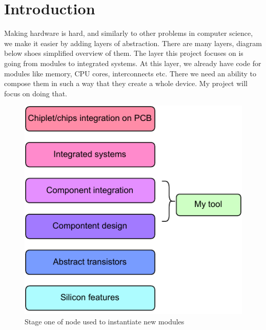 \documentclass[12pt]{report}
\begin{document}
\chapter{Introduction}
Making hardware is hard, and similarly to other problems in computer science, we make it easier by adding layers of abstraction. There are many layers, diagram below shoes simplified overview of them. The layer this project focuses on is going from modules to integrated systems. At this layer, we already have code for modules like memory, CPU cores, interconnects etc. There we need an ability to compose them in such a way that they create a whole device. My project will focus on doing that.
\begin{figure}[h!]
    \centering
    \includegraphics[width=0.5\columnwidth]{pdfExports/LargeMapLayersOfAbstraction.pdf}
    \caption{Stage one of node used to instantiate new modules}
\end{figure}
%     
\end{document}

